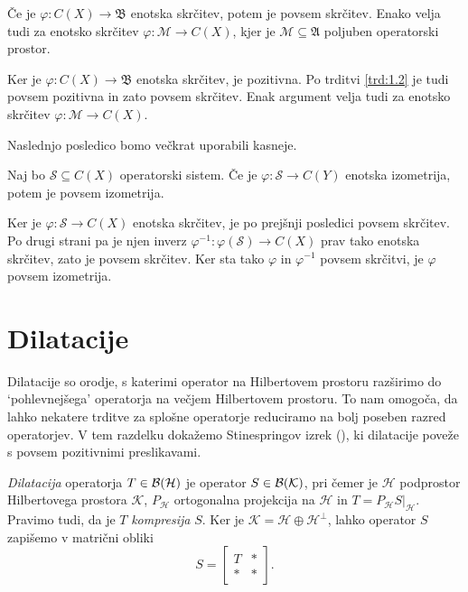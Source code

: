 \begin{posledica}
    Če je $\varphi: C(X) \to \mathfrak{B}$ enotska skrčitev, potem je povsem skrčitev.
    Enako velja tudi za enotsko skrčitev $\varphi: \mathcal{M} \to C(X)$,
    kjer je $\mathcal{M} \subseteq \mathfrak{A}$ poljuben operatorski prostor.
\end{posledica}

\begin{dokaz}
    Ker je $\varphi: C(X) \to \mathfrak{B}$ enotska skrčitev, je pozitivna.
    Po trditvi \ref{trd:1.2} je tudi povsem pozitivna in zato povsem skrčitev. 
    Enak argument velja tudi za enotsko skrčitev $\varphi: \mathcal{M} \to C(X)$.
\end{dokaz}

Naslednjo posledico bomo večkrat uporabili kasneje.

\begin{posledica}\label{pos:aux}
    Naj bo $\mathcal{S} \subseteq C(X)$ operatorski sistem.
    Če je $\varphi: \mathcal{S} \to C(Y)$ enotska izometrija, potem je povsem izometrija.
\end{posledica}

\begin{dokaz}
    Ker je $\varphi: \mathcal{S} \to C(X)$ enotska skrčitev, je po prejšnji posledici povsem skrčitev.
    Po drugi strani pa je njen inverz $\varphi^{-1}: \varphi(\mathcal{S}) \to C(X)$ prav tako enotska skrčitev,
    zato je povsem skrčitev. Ker sta tako $\varphi$ in $\varphi^{-1}$ povsem skrčitvi, je $\varphi$ povsem izometrija.
\end{dokaz}

\section{Dilatacije}\label{sec:6}

Dilatacije so orodje, s katerimi operator na Hilbertovem prostoru razširimo do `pohlevnejšega' operatorja na večjem Hilbertovem prostoru.
To nam omogoča, da lahko nekatere trditve za splošne operatorje reduciramo na bolj poseben razred operatorjev. 
V tem razdelku dokažemo Stinespringov izrek (\cite{stinespring1955}), ki dilatacije poveže s povsem pozitivnimi preslikavami.


\begin{definicija}
    \emph{Dilatacija} operatorja $T \in \operatorname{\mathcal{B} (\mathcal{H})}$ je operator $S \in \operatorname{\mathcal{B} (\mathcal{K})}$, pri čemer 
    je $\mathcal{H}$ podprostor Hilbertovega prostora $\mathcal{K}$, $P_{\mathcal{H}}$ ortogonalna projekcija na $\mathcal{H}$
    in $T = P_{\mathcal{H}} S\big|_{\mathcal{H}}$.
    Pravimo tudi, da je $T$ \emph{kompresija} $S$.
    Ker je $\mathcal{K} = \mathcal{H} \oplus \mathcal{H}^\perp$, lahko operator $S$ zapišemo v matrični obliki
    $$S = \begin{bmatrix}
        T & *\\
        * & *
    \end{bmatrix}.$$    
\end{definicija}


